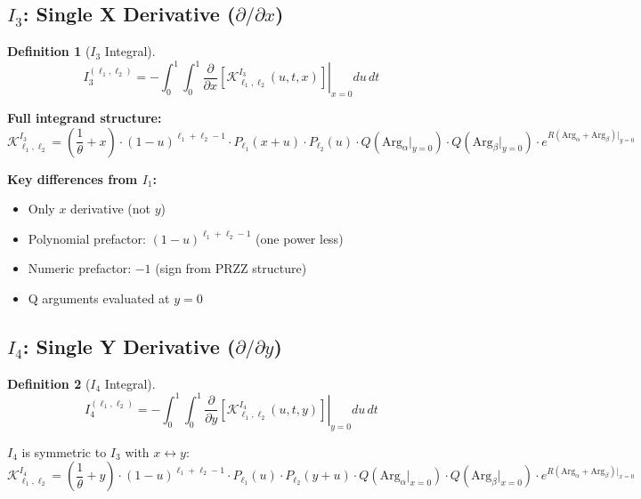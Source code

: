 \documentclass[11pt]{article}
\newtheorem{definition}{Definition}
\begin{document}
\subsection{$I_3$: Single X Derivative ($\partial/\partial x$)}

\begin{definition}[$I_3$ Integral]
\begin{equation}
\boxed{
I_3^{(\ell_1,\ell_2)} = -\int_0^1 \int_0^1 \left.\frac{\partial}{\partial x}\left[\mathcal{K}^{I_3}_{\ell_1,\ell_2}(u,t,x)\right]\right|_{x=0} du\, dt
}
\end{equation}
\end{definition}

\textbf{Full integrand structure:}
\begin{equation}
\mathcal{K}^{I_3}_{\ell_1,\ell_2} = \left(\frac{1}{\theta} + x\right) \cdot (1-u)^{\ell_1+\ell_2-1} \cdot P_{\ell_1}(x+u) \cdot P_{\ell_2}(u) \cdot Q(\text{Arg}_\alpha|_{y=0}) \cdot Q(\text{Arg}_\beta|_{y=0}) \cdot e^{R(\text{Arg}_\alpha+\text{Arg}_\beta)|_{y=0}}
\end{equation}

\textbf{Key differences from $I_1$:}
\begin{itemize}
\item Only $x$ derivative (not $y$)
\item Polynomial prefactor: $(1-u)^{\ell_1+\ell_2-1}$ (one power less)
\item Numeric prefactor: $-1$ (sign from PRZZ structure)
\item Q arguments evaluated at $y=0$
\end{itemize}

\subsection{$I_4$: Single Y Derivative ($\partial/\partial y$)}

\begin{definition}[$I_4$ Integral]
\begin{equation}
\boxed{
I_4^{(\ell_1,\ell_2)} = -\int_0^1 \int_0^1 \left.\frac{\partial}{\partial y}\left[\mathcal{K}^{I_4}_{\ell_1,\ell_2}(u,t,y)\right]\right|_{y=0} du\, dt
}
\end{equation}
\end{definition}

$I_4$ is symmetric to $I_3$ with $x \leftrightarrow y$:
\begin{equation}
\mathcal{K}^{I_4}_{\ell_1,\ell_2} = \left(\frac{1}{\theta} + y\right) \cdot (1-u)^{\ell_1+\ell_2-1} \cdot P_{\ell_1}(u) \cdot P_{\ell_2}(y+u) \cdot Q(\text{Arg}_\alpha|_{x=0}) \cdot Q(\text{Arg}_\beta|_{x=0}) \cdot e^{R(\text{Arg}_\alpha+\text{Arg}_\beta)|_{x=0}}
\end{equation}
\end{document}
